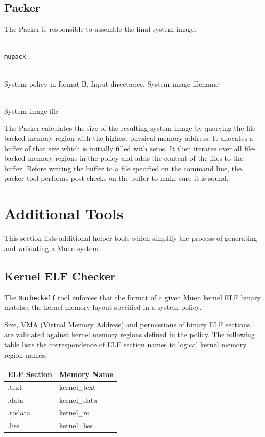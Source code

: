 \documentclass[a4paper,twoside,titlepage]{article}
\begin{document}
\subsection{Packer}
\label{sec:tools-packer}
The Packer is responsible to assemble the final system image.

\begin{description} \itemsep1pt \parskip0pt
	\item[Name] \hfill \\
		\texttt{mupack}
	\item[Input] \hfill \\
		System policy in format B, Input directories, System image filename
	\item[Output] \hfill \\
		System image file
\end{description}

The Packer calculates the size of the resulting system image by querying the
file-backed memory region with the highest physical memory address. It
allocates a buffer of that size which is initially filled with zeros. It then
iterates over all file-backed memory regions in the policy and adds the content
of the files to the buffer. Before writing the buffer to a file specified on
the command line, the packer tool performs post-checks on the buffer to make
sure it is sound.

\section{Additional Tools}
\label{sec:addtools}

This section lists additional helper tools which simplify the process of
generating and validating a Muen system.

\subsection{Kernel ELF Checker}
\label{sec:mucheckelf}
The \texttt{Mucheckelf} tool enforces that the format of a given Muen kernel
ELF binary matches the kernel memory layout specified in a system policy.

Size, VMA (Virtual Memory Address) and permissions of binary ELF sections are
validated against kernel memory regions defined in the policy. The following
table lists the correspondence of ELF section names to logical kernel memory
region names.

\begin{table}[h]
	\centering
	\begin{tabular}{l|l}
		\textbf{ELF Section} & \textbf{Memory Name} \\
		\hline
		.text   & kernel\_text \\
		.data   & kernel\_data \\
		.rodata & kernel\_ro   \\
		.bss    & kernel\_bss  \\
		\hline
	\end{tabular}
\end{table}
\end{document}
